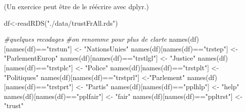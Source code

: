 \documentclass[
]{book}
\newenvironment{Shaded}{\begin{snugshade}}{\end{snugshade}}
\newcommand{\CommentTok}[1]{\textcolor[rgb]{0.56,0.35,0.01}{\textit{#1}}}
\newcommand{\FunctionTok}[1]{\textcolor[rgb]{0.00,0.00,0.00}{#1}}
\newcommand{\NormalTok}[1]{#1}
\newcommand{\OtherTok}[1]{\textcolor[rgb]{0.56,0.35,0.01}{#1}}
\newcommand{\SpecialCharTok}[1]{\textcolor[rgb]{0.00,0.00,0.00}{#1}}
\newcommand{\StringTok}[1]{\textcolor[rgb]{0.31,0.60,0.02}{#1}}
\begin{document}
(Un exercice peut être de le réécrire avec dplyr.)

\begin{Shaded}
\begin{Highlighting}[]
\NormalTok{df}\OtherTok{\textless{}{-}}\FunctionTok{readRDS}\NormalTok{(}\StringTok{"./data/trustFrAll.rds"}\NormalTok{)}

\CommentTok{\#quelques recodages}
\CommentTok{\#on renomme pour plus de clarte}
\FunctionTok{names}\NormalTok{(df)[}\FunctionTok{names}\NormalTok{(df)}\SpecialCharTok{==}\StringTok{"trstun"}\NormalTok{] }\OtherTok{\textless{}{-}} \StringTok{"NationsUnies"} 
\FunctionTok{names}\NormalTok{(df)[}\FunctionTok{names}\NormalTok{(df)}\SpecialCharTok{==}\StringTok{"trstep"}\NormalTok{] }\OtherTok{\textless{}{-}} \StringTok{"ParlementEurop"} 
\FunctionTok{names}\NormalTok{(df)[}\FunctionTok{names}\NormalTok{(df)}\SpecialCharTok{==}\StringTok{"trstlgl"}\NormalTok{] }\OtherTok{\textless{}{-}} \StringTok{"Justice"} 
\FunctionTok{names}\NormalTok{(df)[}\FunctionTok{names}\NormalTok{(df)}\SpecialCharTok{==}\StringTok{"trstplc"}\NormalTok{] }\OtherTok{\textless{}{-}} \StringTok{"Police"} 
\FunctionTok{names}\NormalTok{(df)[}\FunctionTok{names}\NormalTok{(df)}\SpecialCharTok{==}\StringTok{"trstplt"}\NormalTok{] }\OtherTok{\textless{}{-}} \StringTok{"Politiques"} 
\FunctionTok{names}\NormalTok{(df)[}\FunctionTok{names}\NormalTok{(df)}\SpecialCharTok{==}\StringTok{"trstprl"}\NormalTok{] }\OtherTok{\textless{}{-}}\StringTok{"Parlement"} 
\FunctionTok{names}\NormalTok{(df)[}\FunctionTok{names}\NormalTok{(df)}\SpecialCharTok{==}\StringTok{"trstprt"}\NormalTok{] }\OtherTok{\textless{}{-}} \StringTok{"Partis"}
\FunctionTok{names}\NormalTok{(df)[}\FunctionTok{names}\NormalTok{(df)}\SpecialCharTok{==}\StringTok{"pplhlp"}\NormalTok{] }\OtherTok{\textless{}{-}} \StringTok{"help"}
\FunctionTok{names}\NormalTok{(df)[}\FunctionTok{names}\NormalTok{(df)}\SpecialCharTok{==}\StringTok{"pplfair"}\NormalTok{] }\OtherTok{\textless{}{-}} \StringTok{"fair"}
\FunctionTok{names}\NormalTok{(df)[}\FunctionTok{names}\NormalTok{(df)}\SpecialCharTok{==}\StringTok{"ppltrst"}\NormalTok{] }\OtherTok{\textless{}{-}} \StringTok{"trust"}


\end{Highlighting}
\end{Shaded}
\end{document}

